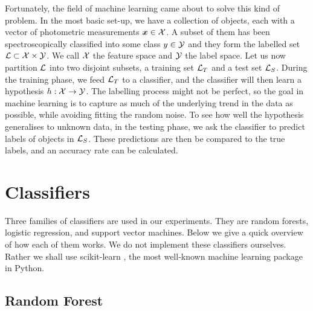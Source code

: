 Fortunately, the field of machine learning came about to solve this kind of problem. In the most
basic set-up, we have a collection of objects, each with a vector of photometric measurements
$\bm{x} \in \mathcal{X}$. A subset of them has been spectroscopically classified into some class $y \in \mathcal{Y}$
and they form the labelled set $\mathcal{L} \subset \mathcal{X} \times \mathcal{Y}$. We call $\mathcal{X}$ the feature space and
$\mathcal{Y}$ the label space. Let us now partition $\mathcal{L}$ into two disjoint subsets, a training set
$\mathcal{L}_T$ and a test set $\mathcal{L}_S$. During the training phase, we feed  $\mathcal{L}_T$ to a
classifier, and the classifier will then learn a hypothesis $h: \mathcal{X} \rightarrow \mathcal{Y}$. The labelling
process might not be perfect, so the goal in machine learning is to capture as much of the
underlying trend in the data as possible, while avoiding fitting the random noise. To see how well
the hypothesis generalises to unknown data, in the testing phase, we ask the classifier to predict
labels of objects in  $\mathcal{L}_S$. These predictions are then be compared to the true labels,
and an accuracy rate can be calculated.


\section{Classifiers}
\label{sec:classifiers}

Three families of classifiers are used in our experiments. They are random forests, logistic
regression, and support vector machines. Below we give a quick overview of how each of them works.
We do not implement these classifiers ourselves. Rather we shall use scikit-learn
\cite{pedregosa11}, the most well-known machine learning package in Python.

\subsection{Random Forest} 
\label{sub:forest}

